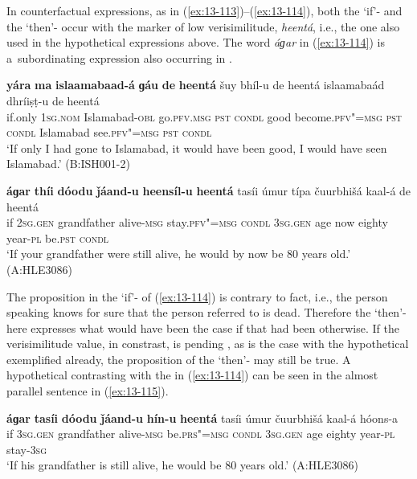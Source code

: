  In counterfactual expressions, as in (\ref{ex:13-113})--(\ref{ex:13-114}), both the `if'- and the `then'- occur with the  marker of low verisimilitude, \textit{heentá}, i.e., the one also used in the hypothetical expressions above. The word \textit{áɡar} in (\ref{ex:13-114}) is a~subordinating expression also occurring in \iliUrdu {} \citep[101--103]{schmidt1999}.

\ea
\label{ex:13-113}
\gll \textbf{yára} \textbf{ma} \textbf{islaamabaad-á} \textbf{ɡáu} \textbf{de} \textbf{heentá} šuy bhíl-u de heentá islaamabaád  dhríiṣṭ-u de heentá\\
if.only \textsc{1sg.nom} Islamabad-\textsc{obl} go.\textsc{pfv.msg} \textsc{pst}  \textsc{condl} good become.\textsc{pfv"=msg} \textsc{pst} \textsc{condl} Islamabad see.\textsc{pfv"=msg} \textsc{pst} \textsc{condl}\\
\glt `If only I had gone to Islamabad, it would have been good, I would have seen Islamabad.' (B:ISH001-2)

\ex
\label{ex:13-114}
\gll \label{bkm:Ref190830564}\textbf{áɡar} \textbf{thíi} \textbf{dóodu} \textbf{ǰáand-u} \textbf{heensíl-u} \textbf{heentá} tasíi úmur típa čuurbhišá kaal-á de heentá\\
if \textsc{2sg.gen} grandfather alive-\textsc{msg} stay.\textsc{pfv"=msg}  \textsc{condl} 
\textsc{3sg.gen} age now eighty year-\textsc{pl} be.\textsc{pst} \textsc{condl} \\
\glt `If your grandfather were still alive, he would by now be 80 years old.' (A:HLE3086) 
\z

The proposition in the `if'- of (\ref{ex:13-114}) is contrary to fact, i.e., the person speaking knows for sure that the person referred to is dead. Therefore the `then'- here expresses what would have been the case if that had been otherwise. If the verisimilitude value, in constrast, is pending \citep[332]{givon2001b}, as is the case with the hypothetical  exemplified already, the proposition of the `then'- may still be true. A hypothetical  contrasting with the  in (\ref{ex:13-114}) can be seen in the almost parallel sentence in (\ref{ex:13-115}).

\begin{exe}
\ex
\label{ex:13-115}
\gll \textbf{áɡar} \textbf{tasíi} \textbf{dóodu} \textbf{ǰáand-u} \textbf{hín-u} \textbf{heentá} tasíi úmur čuurbhišá kaal-á hóons-a \\
if \textsc{3sg.gen} grandfather alive-\textsc{msg} be.\textsc{prs"=msg}  \textsc{condl} \textsc{3sg.gen} age eighty year-\textsc{pl} stay-\textsc{3sg} \\
\glt `If his grandfather is still alive, he would be 80 years old.' (A:HLE3086) 
\end{exe}

